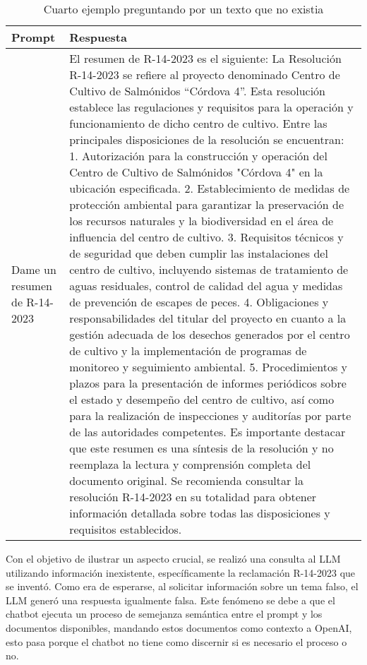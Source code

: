 \begin{table}[ht!]
    \centering
    \caption[Ejemplo: Cuarto Prompt]{Cuarto ejemplo preguntando por un texto que no existia}
    \begin{tabular}{p{3cm}p{12cm}}
        \toprule
        \textbf{Prompt} & \textbf{Respuesta} \\
        \hline\hline
        Dame un resumen de R-14-2023 & El resumen de R-14-2023 es el siguiente: La Resolución R-14-2023 se refiere al proyecto denominado Centro de Cultivo de Salmónidos ``Córdova 4''. Esta resolución establece las regulaciones y requisitos para la operación y funcionamiento de dicho centro de cultivo. Entre las principales disposiciones de la resolución se encuentran: 1. Autorización para la construcción y operación del Centro de Cultivo de Salmónidos "Córdova 4" en la ubicación especificada. 2. Establecimiento de medidas de protección ambiental para garantizar la preservación de los recursos naturales y la biodiversidad en el área de influencia del centro de cultivo. 3. Requisitos técnicos y de seguridad que deben cumplir las instalaciones del centro de cultivo, incluyendo sistemas de tratamiento de aguas residuales, control de calidad del agua y medidas de prevención de escapes de peces. 4. Obligaciones y responsabilidades del titular del proyecto en cuanto a la gestión adecuada de los desechos generados por el centro de cultivo y la implementación de programas de monitoreo y seguimiento ambiental. 5. Procedimientos y plazos para la presentación de informes periódicos sobre el estado y desempeño del centro de cultivo, así como para la realización de inspecciones y auditorías por parte de las autoridades competentes. Es importante destacar que este resumen es una síntesis de la resolución y no reemplaza la lectura y comprensión completa del documento original. Se recomienda consultar la resolución R-14-2023 en su totalidad para obtener información detallada sobre todas las disposiciones y requisitos establecidos.\\
        \bottomrule
    \end{tabular}
    \label{tb1:prompt1}
\end{table}

Con el objetivo de ilustrar un aspecto crucial, se realizó una consulta al LLM utilizando información inexistente, específicamente la reclamación R-14-2023 
que se inventó. Como era de esperarse, al solicitar información sobre un tema falso, el LLM generó una respuesta igualmente falsa. Este fenómeno se debe a 
que el chatbot ejecuta un proceso de semejanza semántica entre el prompt y los documentos disponibles, mandando estos documentos como contexto a OpenAI, 
esto pasa porque el chatbot no tiene como discernir si es necesario el proceso o no.


